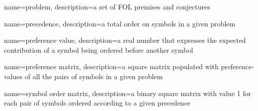 \usepackage{glossaries}
\makeglossaries

{
	name=problem,
	description={a set of FOL premises and conjectures}
}

{
	name=precedence,
	description={a total order on symbols in a given \gls{problem}}
}

{
	name=preference value,
	description={a real number that expresses the expected contribution of a symbol being ordered before another symbol}
}

{
	name=preference matrix,
	description={a square matrix populated with \glspl{preference-value} of all the pairs of symbols in a given \gls{problem}}
}

{
	name=symbol order matrix,
	description={a binary square matrix with value 1 for each pair of symbols ordered according to a given \gls{precedence}}
}
